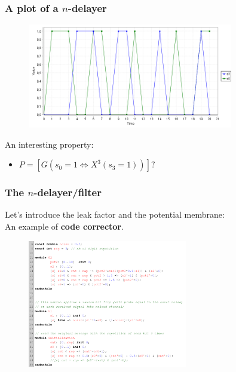 \begin{frame}
  \frametitle{A plot of a $n$-delayer}

  \begin{figure}
    \includegraphics[width=0.8\textwidth]{pic/simple_serie1_plot.png}
  \end{figure}

  \mysep{}

  An interesting property:
  \begin{itemize}
    \item $P = [G (s_0 = 1 \Leftrightarrow X^3 (s_3=1))] ? $ 
  \end{itemize}

\end{frame}

\begin{frame}
  \frametitle{The $n$-delayer/filter}

  Let's introduce the leak factor and the potential membrane:\\ An example of \textbf{code corrector}.

  \begin{figure}
    \includegraphics[width=0.62\textwidth]{pic/simple_serie_corr_code.png}
  \end{figure}

\end{frame}

